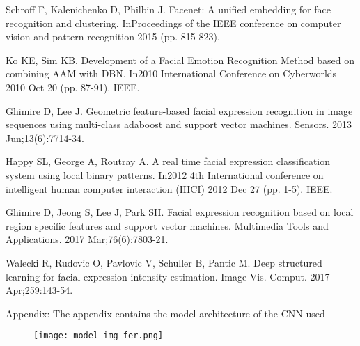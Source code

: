 \documentclass[letterpaper,10pt]{article}
\begin{document}
\begin{thebibliography}{00}
 Schroff F, Kalenichenko D, Philbin J. Facenet: A unified embedding for face recognition and clustering. InProceedings of the IEEE conference on computer vision and pattern recognition 2015 (pp. 815-823).

 Ko KE, Sim KB. Development of a Facial Emotion Recognition Method based on combining AAM with DBN. In2010 International Conference on Cyberworlds 2010 Oct 20 (pp. 87-91). IEEE.

 Ghimire D, Lee J. Geometric feature-based facial expression recognition in image sequences using multi-class adaboost and support vector machines. Sensors. 2013 Jun;13(6):7714-34.

 Happy SL, George A, Routray A. A real time facial expression classification system using local binary patterns. In2012 4th International conference on intelligent human computer interaction (IHCI) 2012 Dec 27 (pp. 1-5). IEEE.

 Ghimire D, Jeong S, Lee J, Park SH. Facial expression recognition based on local region specific features and support vector machines. Multimedia Tools and Applications. 2017 Mar;76(6):7803-21.

 Walecki R, Rudovic O, Pavlovic V, Schuller B, Pantic M. Deep structured learning for facial expression intensity estimation. Image Vis. Comput. 2017 Apr;259:143-54.


\end{thebibliography}
\vspace{12pt}
Appendix: The appendix contains the model architecture of the CNN used
\begin{figure}[htbp]
\centerline{\texttt{[image: model\_img\_fer.png]}}

\label{fig}
\end{figure}
\end{document}
